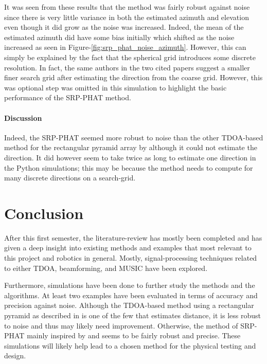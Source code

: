 \documentclass{report}
\begin{document}
It was seen from these results that the method was fairly robust against noise since there is very little variance in both the estimated azimuth and elevation even though it did grow as the noise was increased. Indeed, the mean of the estimated azimuth did have some bias initially which shifted as the noise increased as seen in Figure-\ref{fig:srp_phat_noise_azimuth}. However, this can simply be explained by the fact that the spherical grid introduces some discrete resolution. In fact, the same authors in the two cited papers \cite{valin_localization_2004} \cite{valin_robust_2007} suggest a smaller finer search grid after estimating the direction from the coarse grid. However, this was optional step was omitted in this simulation to highlight the basic performance of the SRP-PHAT method.

\subsubsection{Discussion}

Indeed, the SRP-PHAT seemed more robust to noise than the other TDOA-based method for the rectangular pyramid array by \cite{chen_sound_2019} although it could not estimate the direction. It did however seem to take twice as long to estimate one direction in the Python simulations; this may be because the method needs to compute for many discrete directions on a search-grid.

\chapter{Conclusion}

After this first semester, the literature-review has mostly been completed and has given a deep insight into existing methods and examples that most relevant to this project and robotics in general. Mostly, signal-processing techniques related to either TDOA, beamforming, and MUSIC have been explored.

Furthermore, simulations have been done to further study the methods and the algorithms. At least two examples have been evaluated in terms of accuracy and precision against noise. Although the TDOA-based method using a rectangular pyramid as described in \cite{chen_sound_2019} is one of the few that estimates distance, it is less robust to noise and thus may likely need improvement. Otherwise, the method of SRP-PHAT mainly inspired by \cite{valin_localization_2004} and \cite{valin_robust_2007} seems to be fairly robust and precise. These simulations will likely help lead to a chosen method for the physical testing and design.
\end{document}
